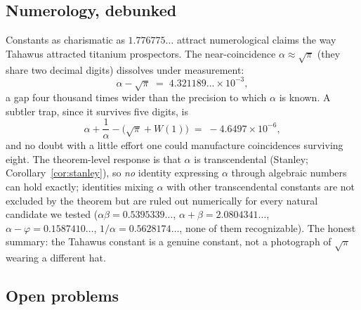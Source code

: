 \subsection{Numerology, debunked}

Constants as charismatic as $1.776775\ldots$ attract numerological
claims the way Tahawus attracted titanium prospectors. The
near-coincidence $\alpha \approx \sqrt{\pi}$ (they share two decimal
digits) dissolves under measurement:
\[
    \alpha - \sqrt{\pi} \;=\; 4.321189\ldots \times 10^{-3},
\]
a gap four thousand times wider than the precision to which $\alpha$
is known. A subtler trap, since it survives five digits, is
\[
    \alpha + \frac{1}{\alpha} - \bigl(\sqrt{\pi} + W(1)\bigr)
    \;=\; -4.6497 \times 10^{-6} ,
\]
and no doubt with a little effort one could manufacture coincidences
surviving eight. The theorem-level response is that
$\alpha$ is transcendental (Stanley; Corollary~\ref{cor:stanley}), so
\emph{no} identity expressing $\alpha$ through algebraic numbers can
hold exactly; identities mixing $\alpha$ with other transcendental
constants are not excluded by the theorem but are ruled out
numerically for every natural candidate we tested
($\alpha\beta = 0.5395339\ldots$, $\alpha + \beta = 2.0804341\ldots$,
$\alpha - \varphi = 0.1587410\ldots$, $1/\alpha = 0.5628174\ldots$,
none of them recognizable). The honest summary: the Tahawus constant
is a genuine constant, not a photograph of $\sqrt{\pi}$ wearing a
different hat.

\subsection{Open problems}


